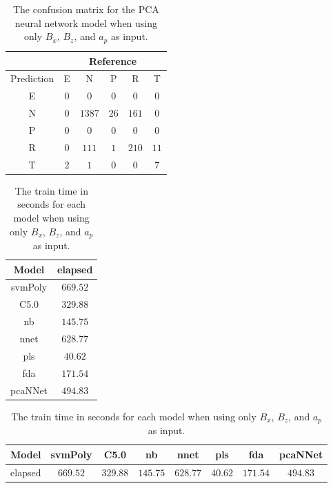 \begin{table}[!ht]
	\centering
	\begin{tabular}{|c|c|c|c|c|c|}
		\hline
		 & \multicolumn{5}{|c|}{Reference} \\ \hline
		 Prediction & E & N & P & R & T \\ \hline
		 E & $0$ & $0$ & $0$ & $0$ & $0$ \\ \hline
		 N & $0$ & $1387$ & $26$ & $161$ & $0$ \\ \hline
		 P & $0$ & $0$ & $0$ & $0$ & $0$ \\ \hline
		 R & $0$ & $111$ & $1$ & $210$ & $11$ \\ \hline
		 T & $2$ & $1$ & $0$ & $0$ & $7$ \\ \hline
	\end{tabular}
	\caption{The confusion matrix for the PCA neural network model when using only $B_{x}$, $B_{z}$, and $a_{p}$ as input.}
	\label{tab:cm:xzap:pcaNNet}
\end{table}

\begin{table}[!ht]
	\centering
	\begin{tabular}{|c|c|}
		\hline
		Model & elapsed \\ \hline
		svmPoly & $669.52$ \\ \hline
		C5.0 & $329.88$ \\ \hline
		nb & $145.75$ \\ \hline
		nnet & $628.77$ \\ \hline
		pls & $40.62$ \\ \hline
		fda & $171.54$ \\ \hline
		pcaNNet & $494.83$ \\ \hline
	\end{tabular}
	\caption{The train time in seconds for each model when using only $B_{x}$, $B_{z}$, and $a_{p}$ as input.}
	\label{tab:time:xzap:train}
\end{table}

\begin{table}[!ht]
	\centering
	\begin{tabular}{|c|c|c|c|c|c|c|c|}
		\hline
		Model & svmPoly & C5.0 & nb & nnet & pls & fda & pcaNNet \\ \hline
		elapsed & $669.52$ & $329.88$ & $145.75$ & $628.77$ & $40.62$ & $171.54$ & $494.83$ \\ \hline
	\end{tabular}
	\caption{The train time in seconds for each model when using only $B_{x}$, $B_{z}$, and $a_{p}$ as input.}
	\label{tab:time:reverse:xzap:train}
\end{table}

